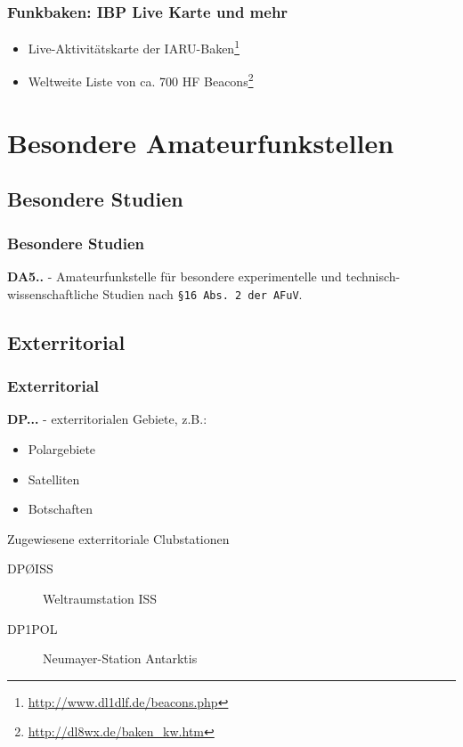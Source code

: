 \begin{frame}
    \frametitle{Funkbaken: IBP Live Karte und mehr}

    \begin{itemize}
        \item Live-Aktivitätskarte der IARU-Baken\footnote{\url{http://www.dl1dlf.de/beacons.php}}
        \item Weltweite Liste von ca. 700 HF Beacons\footnote{\url{http://dl8wx.de/baken_kw.htm}}
    \end{itemize}

\end{frame}

\section{Besondere Amateurfunkstellen}

\subsection{Besondere Studien}

\begin{frame}
    \frametitle{Besondere Studien}

     \textbf{DA5..} - Amateurfunkstelle für besondere experimentelle und
     technisch-wissenschaftliche Studien nach \texttt{§16 Abs. 2 der AFuV}.

\end{frame}

\subsection{Exterritorial}

\begin{frame}
    \frametitle{Exterritorial}

    \textbf{DP...} - exterritorialen Gebiete, z.B.:
    
    \begin{itemize}
        \item Polargebiete
        \item Satelliten
        \item Botschaften
    \end{itemize}

    \begin{exampleblock}{Zugewiesene exterritoriale Clubstationen}
      \begin{description}
       \item[DPØISS] Weltraumstation ISS
       \item[DP1POL] Neumayer-Station Antarktis
      \end{description}
    \end{exampleblock}

\end{frame}

